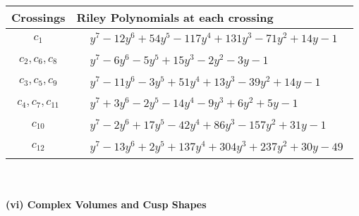 \documentclass[1p]{elsarticle_modified}
\theoremstyle{definition}
\begin{document}
\begin{tabular}{m{50pt}|m{274pt}}
Crossings & \hspace{64pt}Riley Polynomials at each crossing \\
\hline $$\begin{aligned}c_{1}\end{aligned}$$&$\begin{aligned}
&y^7-12 y^6+54 y^5-117 y^4+131 y^3-71 y^2+14 y-1
\end{aligned}$\\
\hline $$\begin{aligned}c_{2},c_{6},c_{8}\end{aligned}$$&$\begin{aligned}
&y^7-6 y^6-5 y^5+15 y^3-2 y^2-3 y-1
\end{aligned}$\\
\hline $$\begin{aligned}c_{3},c_{5},c_{9}\end{aligned}$$&$\begin{aligned}
&y^7-11 y^6-3 y^5+51 y^4+13 y^3-39 y^2+14 y-1
\end{aligned}$\\
\hline $$\begin{aligned}c_{4},c_{7},c_{11}\end{aligned}$$&$\begin{aligned}
&y^7+3 y^6-2 y^5-14 y^4-9 y^3+6 y^2+5 y-1
\end{aligned}$\\
\hline $$\begin{aligned}c_{10}\end{aligned}$$&$\begin{aligned}
&y^7-2 y^6+17 y^5-42 y^4+86 y^3-157 y^2+31 y-1
\end{aligned}$\\
\hline $$\begin{aligned}c_{12}\end{aligned}$$&$\begin{aligned}
&y^7-13 y^6+2 y^5+137 y^4+304 y^3+237 y^2+30 y-49
\end{aligned}$\\
\hline
\end{tabular}\\~\\
\newpage\flushleft \textbf{(vi) Complex Volumes and Cusp Shapes}
\end{document}
